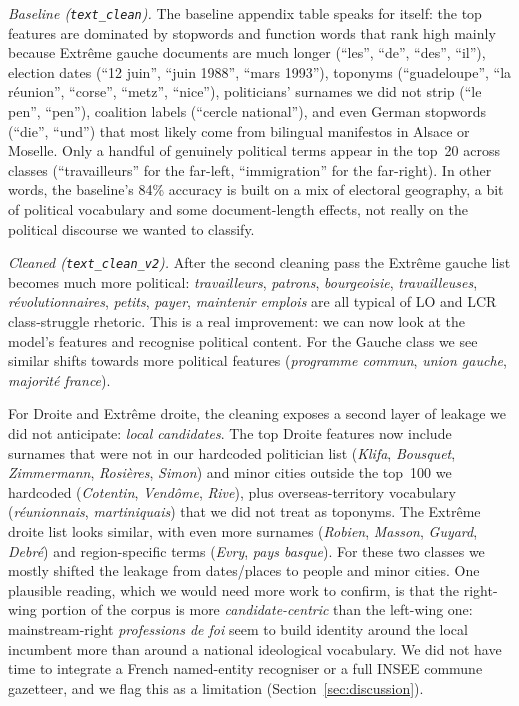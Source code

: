 \documentclass{article}
\begin{document}
\textit{Baseline (\texttt{text\_clean}).} The baseline appendix table speaks for itself: the top features are dominated by stopwords and function words that rank high mainly because Extr\^{e}me gauche documents are much longer (``les'', ``de'', ``des'', ``il''), election dates (``12 juin'', ``juin 1988'', ``mars 1993''), toponyms (``guadeloupe'', ``la r\'{e}union'', ``corse'', ``metz'', ``nice''), politicians' surnames we did not strip (``le pen'', ``pen''), coalition labels (``cercle national''), and even German stopwords (``die'', ``und'') that most likely come from bilingual manifestos in Alsace or Moselle. Only a handful of genuinely political terms appear in the top~20 across classes (``travailleurs'' for the far-left, ``immigration'' for the far-right). In other words, the baseline's 84\% accuracy is built on a mix of electoral geography, a bit of political vocabulary and some document-length effects, not really on the political discourse we wanted to classify.

\textit{Cleaned (\texttt{text\_clean\_v2}).} After the second cleaning pass the Extr\^{e}me gauche list becomes much more political: \textit{travailleurs}, \textit{patrons}, \textit{bourgeoisie}, \textit{travailleuses}, \textit{révolutionnaires}, \textit{petits}, \textit{payer}, \textit{maintenir emplois} are all typical of LO and LCR class-struggle rhetoric. This is a real improvement: we can now look at the model's features and recognise political content. For the Gauche class we see similar shifts towards more political features (\textit{programme commun}, \textit{union gauche}, \textit{majorité france}).

For Droite and Extr\^{e}me droite, the cleaning exposes a second layer of leakage we did not anticipate: \emph{local candidates}. The top Droite features now include surnames that were not in our hardcoded politician list (\textit{Klifa}, \textit{Bousquet}, \textit{Zimmermann}, \textit{Rosières}, \textit{Simon}) and minor cities outside the top~100 we hardcoded (\textit{Cotentin}, \textit{Vendôme}, \textit{Rive}), plus overseas-territory vocabulary (\textit{réunionnais}, \textit{martiniquais}) that we did not treat as toponyms. The Extr\^{e}me droite list looks similar, with even more surnames (\textit{Robien}, \textit{Masson}, \textit{Guyard}, \textit{Debré}) and region-specific terms (\textit{Evry}, \textit{pays basque}). For these two classes we mostly shifted the leakage from dates/places to people and minor cities. One plausible reading, which we would need more work to confirm, is that the right-wing portion of the corpus is more \emph{candidate-centric} than the left-wing one: mainstream-right \textit{professions de foi} seem to build identity around the local incumbent more than around a national ideological vocabulary. We did not have time to integrate a French named-entity recogniser or a full INSEE commune gazetteer, and we flag this as a limitation (Section~\ref{sec:discussion}).
\end{document}
